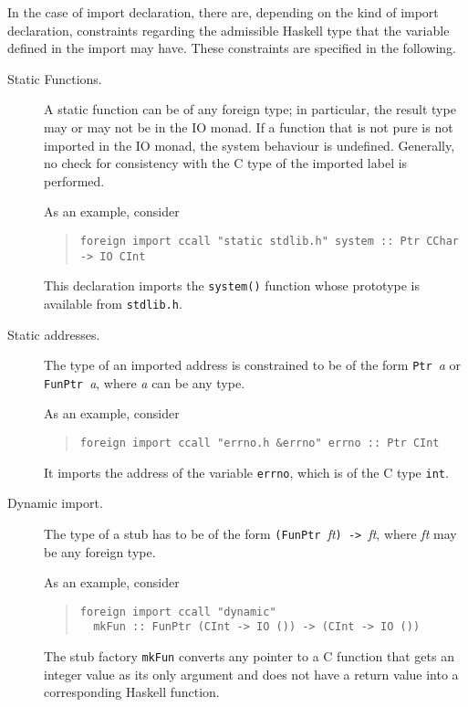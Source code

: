\documentclass[a4paper,twoside]{article}
\newcommand{\code}[1]{\texttt{#1}}      %
\begin{document}
In the case of import declaration, there are, depending on the kind of import
declaration, constraints regarding the admissible Haskell type that the
variable defined in the import may have.  These constraints are specified in
the following.
%
\begin{description}
\item[Static Functions.]  A static function can be of any foreign type; in
  particular, the result type may or may not be in the IO monad.  If a
  function that is not pure is not imported in the IO monad, the system
  behaviour is undefined.  Generally, no check for consistency with the C type
  of the imported label is performed.

  As an example, consider
  \begin{quote}
\begin{verbatim}
foreign import ccall "static stdlib.h" system :: Ptr CChar -> IO CInt
\end{verbatim}
  \end{quote}
  This declaration imports the \code{system()} function whose prototype is
  available from \code{stdlib.h}.

\item[Static addresses.]  The type of an imported address is constrained to be
  of the form \code{Ptr }\textit{a} or \code{FunPtr }\textit{a}, where
  \textit{a} can be any type.

  As an example, consider
  \begin{quote}
\begin{verbatim}
foreign import ccall "errno.h &errno" errno :: Ptr CInt
\end{verbatim}
  \end{quote}
  It imports the address of the variable \code{errno}, which is of the C type
  \code{int}.

\item[Dynamic import.]  The type of a  stub has to be of the
  form \code{(FunPtr }\textit{ft}\code{) -> }\textit{ft}, where \textit{ft} may
  be any foreign type.

  As an example, consider
  \begin{quote}
\begin{verbatim}
foreign import ccall "dynamic" 
  mkFun :: FunPtr (CInt -> IO ()) -> (CInt -> IO ())
\end{verbatim}
  \end{quote}
  The stub factory \code{mkFun} converts any pointer to a C function that gets
  an integer value as its only argument and does not have a return value into
  a corresponding Haskell function.


\end{description}
\end{document}
